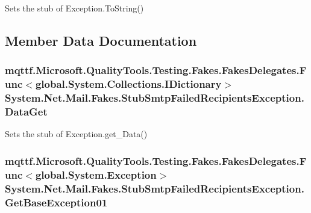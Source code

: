 Sets the stub of Exception.\-To\-String()



\subsection{Member Data Documentation}
\hypertarget{class_system_1_1_net_1_1_mail_1_1_fakes_1_1_stub_smtp_failed_recipients_exception_ab355b951001bca187815bf751afbd6ea}{
\subsubsection[{Data\-Get}]{\setlength{\rightskip}{0pt plus 5cm}mqttf.\-Microsoft.\-Quality\-Tools.\-Testing.\-Fakes.\-Fakes\-Delegates.\-Func$<$global.\-System.\-Collections.\-I\-Dictionary$>$ System.\-Net.\-Mail.\-Fakes.\-Stub\-Smtp\-Failed\-Recipients\-Exception.\-Data\-Get}}\label{class_system_1_1_net_1_1_mail_1_1_fakes_1_1_stub_smtp_failed_recipients_exception_ab355b951001bca187815bf751afbd6ea}


Sets the stub of Exception.\-get\-\_\-\-Data()

\hypertarget{class_system_1_1_net_1_1_mail_1_1_fakes_1_1_stub_smtp_failed_recipients_exception_ae3904eaabbcb766ab189c6bf1510458c}{
\subsubsection[{Get\-Base\-Exception01}]{\setlength{\rightskip}{0pt plus 5cm}mqttf.\-Microsoft.\-Quality\-Tools.\-Testing.\-Fakes.\-Fakes\-Delegates.\-Func$<$global.\-System.\-Exception$>$ System.\-Net.\-Mail.\-Fakes.\-Stub\-Smtp\-Failed\-Recipients\-Exception.\-Get\-Base\-Exception01}}\label{class_system_1_1_net_1_1_mail_1_1_fakes_1_1_stub_smtp_failed_recipients_exception_ae3904eaabbcb766ab189c6bf1510458c}



